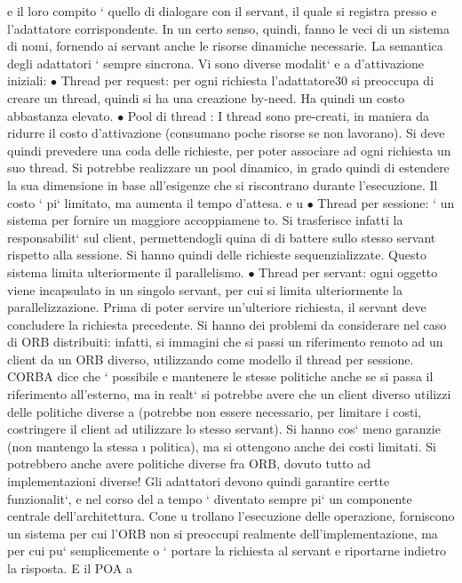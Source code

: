 \documentclass[a4paper,12pt]{article}
\begin{document}
e
il loro compito ` quello di dialogare con il servant, il quale si registra presso
e
l'adattatore corrispondente. In un certo senso, quindi, fanno le veci di un sistema
di nomi, fornendo ai servant anche le risorse dinamiche necessarie.
La semantica degli adattatori ` sempre sincrona. Vi sono diverse modalit`
e
a
d'attivazione iniziali:
$\bullet$ Thread per request: per ogni richiesta l'adattatore30 si preoccupa di creare
un thread, quindi si ha una creazione by-need. Ha quindi un costo abbastanza elevato.
$\bullet$ Pool di thread : I thread sono pre-creati, in maniera da ridurre il costo
d'attivazione (consumano poche risorse se non lavorano). Si deve quindi
prevedere una coda delle richieste, per poter associare ad ogni richiesta un
suo thread.
Si potrebbe realizzare un pool dinamico, in grado quindi di estendere la
sua dimensione in base all'esigenze che si riscontrano durante l'esecuzione.
Il costo ` pi` limitato, ma aumenta il tempo d'attesa.
e u
$\bullet$ Thread per sessione: ` un sistema per fornire un maggiore accoppiamene
to. Si trasferisce infatti la responsabilit` sul client, permettendogli quina
di di battere sullo stesso servant rispetto alla sessione. Si hanno quindi delle richieste sequenzializzate. Questo
sistema limita ulteriormente il
parallelismo.
$\bullet$ Thread per servant: ogni oggetto viene incapsulato in un singolo servant,
per cui si limita ulteriormente la parallelizzazione. Prima di poter servire
un'ulteriore richiesta, il servant deve concludere la richiesta precedente.
Si hanno dei problemi da considerare nel caso di ORB distribuiti: infatti, si
immagini che si passi un riferimento remoto ad un client da un ORB diverso,
utilizzando come modello il thread per sessione. CORBA dice che ` possibile
e
mantenere le stesse politiche anche se si passa il riferimento all'esterno, ma
in realt` si potrebbe avere che un client diverso utilizzi delle politiche diverse
a
(potrebbe non essere necessario, per limitare i costi, costringere il client ad utilizzare lo stesso servant). Si hanno
cos` meno garanzie (non mantengo la stessa
\i{}
politica), ma si ottengono anche dei costi limitati. Si potrebbero anche avere
politiche diverse fra ORB, dovuto tutto ad implementazioni diverse!
Gli adattatori devono quindi garantire certte funzionalit`, e nel corso del
a
tempo ` diventato sempre pi` un componente centrale dell'architettura. Cone
u
trollano l'esecuzione delle operazione, forniscono un sistema per cui l'ORB non
si preoccupi realmente dell'implementazione, ma per cui pu` semplicemente
o
`
portare la richiesta al servant e riportarne indietro la risposta. E il POA a
\end{document}
